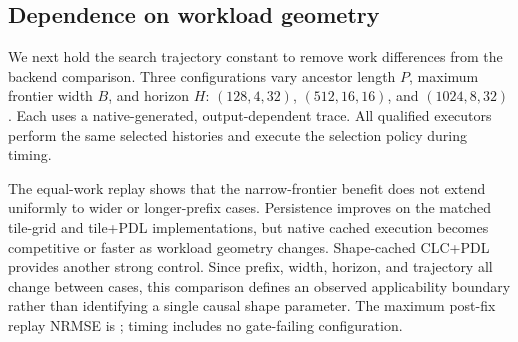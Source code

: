 \subsection{Dependence on workload geometry}
\label{sec:geometry}


We next hold the search trajectory constant to remove work differences from
the backend comparison. Three configurations vary ancestor length $P$,
maximum frontier width $B$, and horizon $H$: $(128,4,32)$, $(512,16,16)$, and
$(1024,8,32)$. Each uses a native-generated, output-dependent trace. All
qualified executors perform the same selected histories and execute the
selection policy during timing.

The equal-work replay shows that the narrow-frontier benefit does not
extend uniformly to wider or longer-prefix cases. Persistence improves on
the matched tile-grid and tile+PDL implementations, but native cached
execution becomes competitive or faster as workload geometry changes.
Shape-cached CLC+PDL provides another strong control. Since prefix, width,
horizon, and trajectory all change between cases, this comparison defines an
observed applicability boundary rather than identifying a single causal
shape parameter. The maximum post-fix replay NRMSE is
; timing includes no gate-failing configuration.

